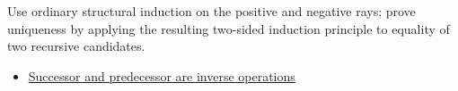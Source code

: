 \begin{remark*}
Use ordinary structural induction on the positive and negative rays; prove
uniqueness by applying the resulting two-sided induction principle to equality
of two recursive candidates.
\end{remark*}

\begin{dependencies}
\begin{itemize}
  \item \hyperref[thm:two-sided-successor-predecessor-inverses]{Successor and predecessor are inverse operations}
\end{itemize}
\end{dependencies}

\clearpage
